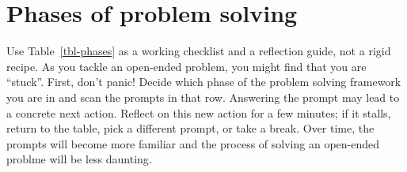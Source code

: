 \documentclass[
  a4paper,
  DIV=11,
  numbers=noendperiod,
  oneside]{scrreprt}
\begin{document}
\section{Phases of problem solving}\label{sec-phases}

Use Table~\ref{tbl-phases} as a working checklist and a reflection
guide, not a rigid recipe. As you tackle an open-ended problem, you
might find that you are ``stuck''. First, don't panic! Decide which
phase of the problem solving framework you are in and scan the prompts
in that row. Answering the prompt may lead to a concrete next action.
Reflect on this new action for a few minutes; if it stalls, return to
the table, pick a different prompt, or take a break. Over time, the
prompts will become more familiar and the process of solving an
open-ended problme will be less daunting.

\clearpage
{} 
\thispagestyle{empty}
\end{document}
